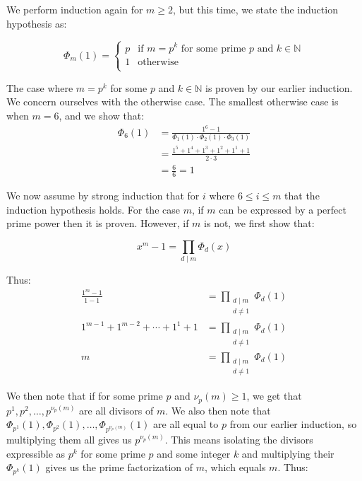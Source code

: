 \documentclass{article}
\begin{document}
\begin{enumerate}
\begin{enumerate}
    We perform induction again for $m \geq 2$, but this time, we state the induction hypothesis as: 

    $$
    \Phi_m(1) =
    \begin{cases}
    p & \text{if } m = p^k \text{ for some prime } p \text{ and } k \in \mathbb{N}\\
    1  & \text{otherwise}\\
    \end{cases}
    $$

    The case where $m = p^k$ for some $p$ and $k \in \mathbb{N}$ is proven by our earlier induction. We concern ourselves with the otherwise case. The smallest otherwise case is when $m = 6$, and we show that:
    \begin{align*}
        \Phi_6(1) &= \frac{1^6-1}{\Phi_1(1)\cdot \Phi_2(1) \cdot \Phi_3(1)} \\
        &= \frac{1^5 + 1^4 + 1^3 + 1^2 + 1^1 + 1 }{2 \cdot 3  }\\
        &= \frac{6}{6}  = 1
    \end{align*}
    
    We now assume by strong induction that for $i$ where $6 \leq i \leq m$ that the induction hypothesis holds. For the case $m$, if $m$ can be expressed by a perfect prime power then it is proven. However, if $m$ is not, we first show that: 

    $$x^m - 1= \prod_{d \mid m} \Phi_d(x)$$

    Thus: 
    \begin{align*}
    \frac{1^m - 1}{1 - 1} &= \prod_{\substack{d \mid m \\ d \neq 1}} \Phi_d(1) \\
    1^{m-1} + 1^{m-2} + \cdots + 1^1 + 1 &= \prod_{\substack{d \mid m \\ d \neq 1}} \Phi_d(1) \\
    m &= \prod_{\substack{d \mid m \\ d \neq 1}} \Phi_d(1)
    \end{align*}

    We then note that if for some prime $p$ and $\nu_p(m) \geq 1$, we get that $p^1, p^2, \ldots,p^{\nu_p(m)}$ are all divisors of $m$. We also then note that $\Phi_{p^1}(1), \Phi_{p^2}(1), \ldots,\Phi_{p^{\nu_p(m)}}(1)$ are all equal to $p$ from our earlier induction, so multiplying them all gives us $p^{\nu_p(m)}$. This means isolating the divisors expressible as $p^k$ for some prime $p$ and some integer $k$ and multiplying their $\Phi_{p^k}(1)$ gives us the prime factorization of $m$, which equals $m$. Thus: 


\end{enumerate}
\end{enumerate}
\end{document}
